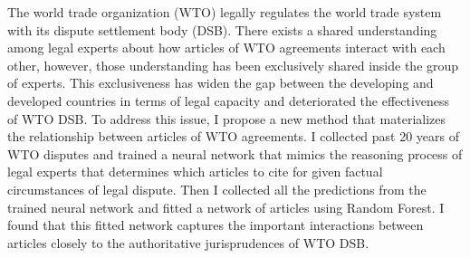 The world trade organization (WTO) legally regulates the world trade system with its dispute settlement body (DSB).
There exists a shared understanding among legal experts about how articles of WTO agreements interact with each other, however, those understanding has been exclusively shared inside the group of experts.  %
This exclusiveness has widen the gap
between the developing and developed countries in terms of
legal capacity and deteriorated the effectiveness of WTO DSB.
To address this issue, I propose a new method that materializes the relationship between articles of WTO agreements. %
I collected past 20 years of WTO disputes and trained a neural network that mimics the reasoning process of legal experts that determines which articles to cite for given factual circumstances of legal dispute.
Then I collected all the predictions from the trained neural network and fitted a network of articles using Random Forest.
I found that this fitted network captures the important interactions between articles closely to the authoritative jurisprudences of WTO DSB.
